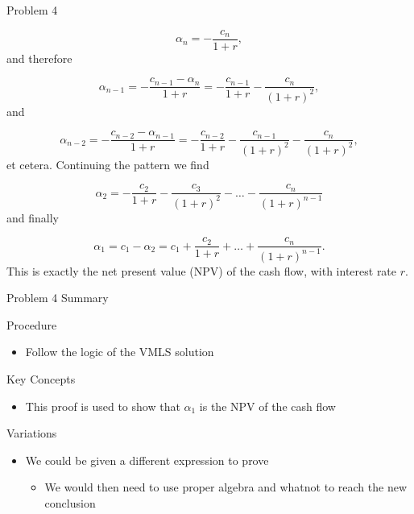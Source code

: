 \begin{problem}{Problem 4}
\begin{Highlight}[Solution]
        \begin{equation*}
            \alpha_{n} = -\frac{c_{n}}{1 + r},
        \end{equation*}
        and therefore

        \begin{equation*}
            \alpha_{n - 1} = -\frac{c_{n - 1} - \alpha_{n}}{1 + r} = -\frac{c_{n - 1}}{1 + r} - \frac{c_{n}}{(1 + r)^2},
        \end{equation*}
        and 

        \begin{equation*}
            \alpha_{n - 2} = -\frac{c_{n -2} - \alpha_{n - 1}}{1 + r} = -\frac{c_{n - 2}}{1 + r} - \frac{c_{n - 1}}{(1 + r)^{2}} - \frac{c_{n}}{(1 + r)^{2}},
        \end{equation*}
        et cetera. Continuing the pattern we find

        \begin{equation*}
            \alpha_{2} = -\frac{c_{2}}{1 + r} -\frac{c_{3}}{(1 + r)^{2}} - \dots - \frac{c_{n}}{(1 + r)^{n-1}}
        \end{equation*}
        and finally

        \begin{equation*}
            \alpha_{1} = c_{1} - \alpha_{2} = c_{1} + \frac{c_{2}}{1 + r} + \dots + \frac{c_{n}}{(1 + r)^{n - 1}}.
        \end{equation*}
        This is exactly the net present value (NPV) of the cash flow, with interest rate $r$.
    \end{Highlight}
\end{problem}

\begin{summary}{Problem 4 Summary}
    \begin{statement}{Procedure}
        \begin{itemize}
            \item Follow the logic of the VMLS solution
        \end{itemize}
    \end{statement}
    \begin{statement}{Key Concepts}
        \begin{itemize}
            \item This proof is used to show that $\alpha_{1}$ is the NPV of the cash flow
        \end{itemize}
    \end{statement}
    \begin{statement}{Variations}
        \begin{itemize}
            \item We could be given a different expression to prove
            \begin{itemize}
                \item We would then need to use proper algebra and whatnot to reach the new conclusion
            \end{itemize}
        \end{itemize}
    \end{statement}
\end{summary}

